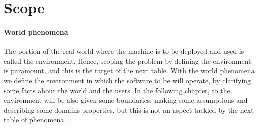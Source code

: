 \section{Scope}
\label{sec:Scope}%
\paragraph{World phenomena} The portion of the real world where the machine is to be deployed and used is called the environment. Hence, scoping the problem by defining the environment is paramount, and this is the target of the next table. With the world phenomena we define the environment in which the software to be will operate, by clarifying some facts about the world and the users. In the following chapter, to the environment will be also given some boundaries, making some assumptions and describing some domains properties, but this is not an aspect tackled by the next table of phenomena.
\setcounter{wp}{1}
\newcommand{\wpcount}{\thewp\stepcounter{wp}}
